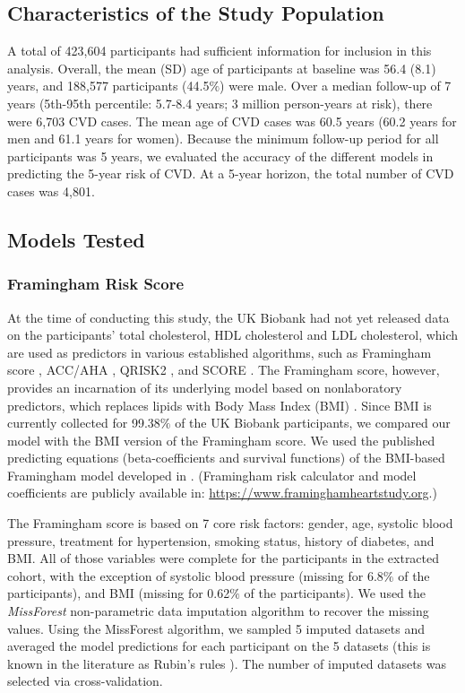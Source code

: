 \documentclass [PhD] {uclathes}
\begin{document}
\subsection{Characteristics of the Study Population}
A total of 423,604 participants had sufficient information for inclusion in this analysis. Overall, the mean (SD) age of participants at baseline was 56.4 (8.1) years, and 188,577 participants (44.5$\%$) were male. Over a median follow-up of 7 years (5th-95th percentile: 5.7-8.4 years; 3 million person-years at risk), there were 6,703 CVD cases. The mean age of CVD cases was 60.5 years (60.2 years for men and 61.1 years for women). Because the minimum follow-up period for all participants was 5 years, we evaluated the accuracy of the different models in predicting the 5-year risk of CVD. At a 5-year horizon, the total number of CVD cases was 4,801.

\subsection{Models Tested}

\subsubsection*{Framingham Risk Score}
At the time of conducting this study, the UK Biobank had not yet released data on the participants' total cholesterol, HDL cholesterol and LDL cholesterol, which are used as predictors in various established algorithms, such as Framingham score \cite{d2008general}, ACC/AHA \cite{goff20142013}, QRISK2 \cite{hippisley2008predicting}, and SCORE \cite{conroy2003estimation}. The Framingham score, however, provides an incarnation of its underlying model based on nonlaboratory predictors, which replaces lipids with Body Mass Index (BMI) \cite{d2008general}. Since BMI is currently collected for 99.38$\%$ of the UK Biobank participants, we compared our model with the BMI version of the Framingham score. We used the published predicting equations (beta-coefficients and survival functions) of the BMI-based Framingham model developed in \cite{d2008general}. (Framingham risk calculator and model coefficients are publicly available in: \href{https://www.framinghamheartstudy.org/fhs-risk-functions/cardiovascular-disease-10-year-risk/}{https://www.framinghamheartstudy.org}.) 

The Framingham score is based on 7 core risk factors: gender, age, systolic blood pressure, treatment for hypertension, smoking status, history of diabetes, and BMI. All of those variables were complete for the participants in the extracted cohort, with the exception of systolic blood pressure (missing for 6.8$\%$ of the participants), and BMI (missing for 0.62$\%$ of the participants). We used the {\it MissForest} non-parametric data imputation algorithm \cite{stekhoven2011missforest} to recover the missing values. Using the MissForest algorithm, we sampled 5 imputed datasets and averaged the model predictions for each participant on the 5 datasets (this is known in the literature as Rubin's rules \cite{stekhoven2011missforest}). The number of imputed datasets was selected via cross-validation.  
 
\end{document}
